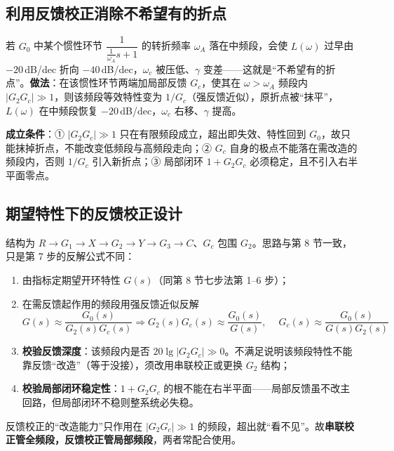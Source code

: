 \subsection{利用反馈校正消除不希望有的折点}
若 $G_0$ 中某个惯性环节 $\dfrac{1}{\frac{1}{\omega_A}s+1}$ 的转折频率 $\omega_A$ 落在中频段，会使 $L(\omega)$ 过早由 $-20$\,dB/dec 折向 $-40$\,dB/dec，$\omega_c$ 被压低、$\gamma$ 变差——这就是“不希望有的折点”。\textbf{做法}：在该惯性环节两端加局部反馈 $G_c$，使其在 $\omega>\omega_A$ 频段内 $|G_2G_c|\gg1$，则该频段等效特性变为 $1/G_c$（强反馈近似），原折点被“抹平”，$L(\omega)$ 在中频段恢复 $-20$\,dB/dec，$\omega_c$ 右移、$\gamma$ 提高。

\textbf{成立条件}：① $|G_2G_c|\gg1$ 只在有限频段成立，超出即失效、特性回到 $G_0$，故只能抹掉折点，不能改变低频段与高频段走向；② $G_c$ 自身的极点不能落在需改造的频段内，否则 $1/G_c$ 引入新折点；③ 局部闭环 $1+G_2G_c$ 必须稳定，且不引入右半平面零点。

\subsection{期望特性下的反馈校正设计}
结构为 $R\to G_1\to X\to G_2\to Y\to G_3\to C$、$G_c$ 包围 $G_2$。思路与第 8 节一致，只是第 7 步的反解公式不同：
\begin{enumerate}
    \item 由指标定期望开环特性 $G(s)$（同第 8 节七步法第 1--6 步）；
    \item 在需反馈起作用的频段用强反馈近似反解
    \[
    G(s)\approx\frac{G_0(s)}{G_2(s)G_c(s)}
    \Longrightarrow
    G_2(s)G_c(s)\approx\frac{G_0(s)}{G(s)},\quad
    \boxed{\ G_c(s)\approx\frac{G_0(s)}{G(s)G_2(s)}\ }
    \]
    \item \textbf{校验反馈深度}：该频段内是否 $20\lg|G_2G_c|\gg0$。不满足说明该频段特性不能靠反馈“改造”（等于没接），须改用串联校正或更换 $G_2$ 结构；
    \item \textbf{校验局部闭环稳定性}：$1+G_2G_c$ 的根不能在右半平面——局部反馈虽不改主回路，但局部闭环不稳则整系统必失稳。
\end{enumerate}
反馈校正的“改造能力”只作用在 $|G_2G_c|\gg1$ 的频段，超出就“看不见”。故\textbf{串联校正管全频段，反馈校正管局部频段}，两者常配合使用。

\bigskip

